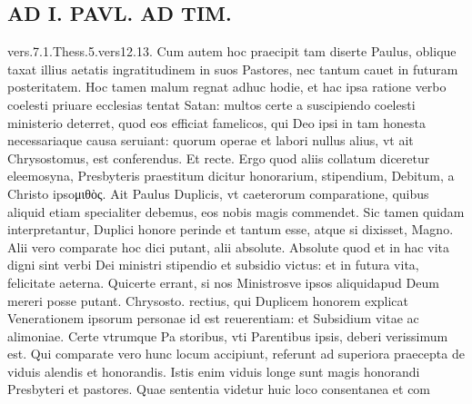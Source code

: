 \documentclass{article}
\begin{document}
\begin{pages}
\section*{AD I. PAVL. AD TIM. }
\marginpar{[ p.306 ]}\pstart vers.7.1.Thess.5.vers12.13. Cum autem hoc praecipit tam diserte Paulus, oblique taxat illius aetatis ingratitudinem in suos Pastores, nec tantum cauet in futuram posteritatem. Hoc tamen malum regnat adhuc hodie, et hac ipsa ratione verbo coelesti priuare ecclesias tentat Satan: multos certe a suscipiendo coelesti ministerio deterret, quod eos efficiat famelicos, qui Deo ipsi in tam honesta necessariaque causa seruiant: quorum operae et labori nullus alius, vt ait Chrysostomus, est conferendus. Et recte. Ergo quod aliis collatum diceretur eleemosyna, Presbyteris praestitum dicitur honorarium, stipendium, Debitum, a Christo ipsoμιθὸς. Ait Paulus Duplicis, vt caeterorum comparatione, quibus aliquid etiam specialiter debemus, eos nobis magis commendet. Sic tamen quidam interpretantur, Duplici honore perinde et tantum esse, atque si dixisset, Magno. Alii vero comparate hoc dici putant, alii absolute. Absolute quod et in hac vita digni sint verbi Dei ministri stipendio et subsidio victus: et in futura vita, felicitate aeterna. Quicerte errant, si nos Ministrosve ipsos aliquidapud Deum mereri posse putant. Chrysosto. rectius, qui Duplicem honorem explicat Venerationem ipsorum personae id est reuerentiam: et Subsidium vitae ac alimoniae. Certe vtrumque Pa storibus, vti Parentibus ipsis, deberi verissimum est. Qui comparate vero hunc locum accipiunt, referunt ad superiora praecepta de viduis alendis et honorandis. Istis enim viduis longe sunt magis honorandi Presbyteri et pastores. Quae sententia videtur huic loco consentanea et com\pend

\end{pages}
\end{document}

